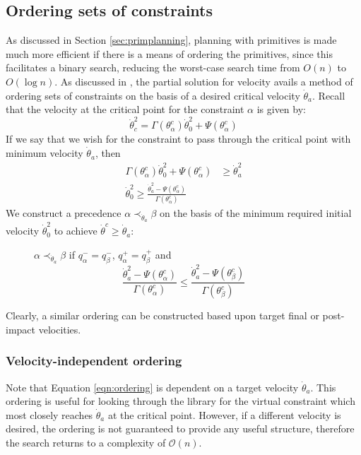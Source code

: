 \subsection{Ordering sets of constraints} \label{sec:orderings}
As discussed in Section \ref{sec:primplanning}, planning with primitives is made much more efficient if there is a means of ordering the primitives, since this facilitates a binary search, reducing the worst-case search time from $O(n)$ to $O(\log n)$. As discussed in \cite{manchester13planning}, the partial solution for velocity avails a method of ordering sets of constraints on the basis of a desired critical velocity $\dot{\theta}_a$. Recall that the velocity at the critical point for the constraint $\alpha$ is given by:
\[
	\dot{\theta}_c^2 = \Gamma(\theta_\alpha^c)\dot{\theta}_0^2 + \Psi(\theta_\alpha^c)
\]
If we say that we wish for the constraint to pass through the critical point with minimum velocity $\dot{\theta}_a$, then
\begin{align*}
	\Gamma(\theta_\alpha^c)\dot{\theta}_0^2 + \Psi(\theta_\alpha^c) &\geq \dot{\theta}_a^2 \\
	\dot{\theta}_0^2 \geq \frac{\dot{\theta}_a^2 - \Psi(\theta_\alpha^c)}{\Gamma(\theta_\alpha^c)}
\end{align*}
We construct a precedence $\alpha \prec_{\dot{\theta}_a} \beta$ on the basis of the minimum required initial velocity $\dot{\theta}_0^2$ to achieve $\dot{\theta}^c\geq\dot{\theta}_a$:

\begin{figure}[h]
\centering
$\alpha \prec_{\dot{\theta}_a} \beta$ if $q_\alpha^-=q_\beta^-$, $q_\alpha^+=q_\beta^+$ and
\begin{equation} \label{eqn:ordering}
	\frac{\dot{\theta}_a^2 - \Psi(\theta_\alpha^c)}{\Gamma(\theta_\alpha^c)}
	\leq
	\frac{\dot{\theta}_a^2 - \Psi(\theta_\beta^c)}{\Gamma(\theta_\beta^c)}
\end{equation}
\end{figure}

Clearly, a similar ordering can be constructed based upon target final or post-impact velocities.

\subsubsection{Velocity-independent ordering}
Note that Equation \ref{eqn:ordering} is dependent on a target velocity $\dot{\theta}_a$. This ordering is useful for looking through the library for the virtual constraint which most closely reaches $\dot{\theta}_a$ at the critical point. However, if a different velocity is desired, the ordering is not guaranteed to provide any useful structure, therefore the search returns to a complexity of $\mathcal{O}(n)$.

